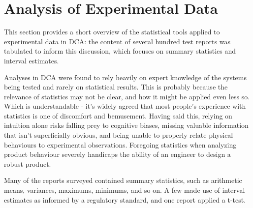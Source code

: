 \documentclass[11pt,a4paper,article]{memoir} %
\begin{document}
\newpage
\section{Analysis of Experimental Data}
This section provides a short overview of the statistical tools applied to experimental data in DCA: the content of several hundred test reports was tabulated to inform this discussion, which focuses on summary statistics and interval estimates.
\par
Analyses in DCA were found to rely heavily on expert knowledge of the systems being tested and rarely on statistical results. This is probably because the relevance of statistics may not be clear, and how it might be applied even less so. Which is understandable - it's widely agreed that most people's experience with statistics is one of discomfort and bemusement. Having said this, relying on intuition alone risks falling prey to cognitive biases, missing valuable information that isn't superficially obvious, and being unable to properly relate physical behaviours to experimental observations. Foregoing statistics when analyzing product behaviour severely handicaps the ability of an engineer to design a robust product.
\par
Many of the reports surveyed contained summary statistics, such as arithmetic means, variances, maximums, minimums, and so on. A few made use of interval estimates as informed by a regulatory standard, and one report applied a t-test.
\par
\end{document}
